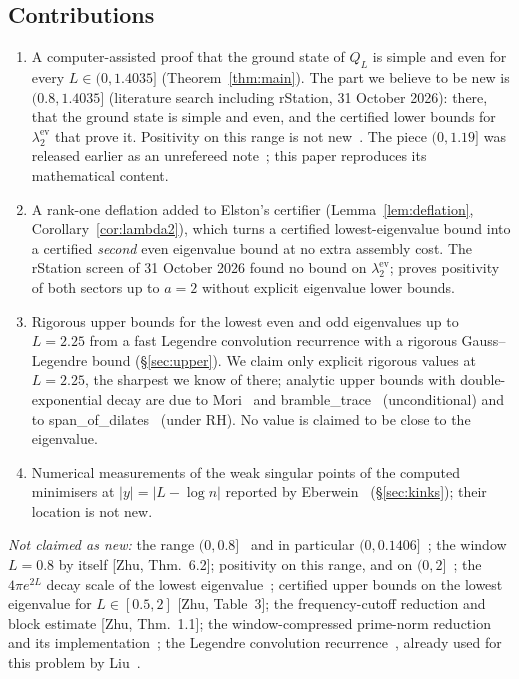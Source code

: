 \documentclass[11pt]{amsart}
\newcommand{\Lmax}{1.4035}                                %
\newcommand{\ev}{\mathrm{ev}}
\theoremstyle{definition}
\theoremstyle{remark}
\numberwithin{equation}{section}
\begin{document}
\subsection{Contributions}
\begin{enumerate}
\item A computer-assisted proof that the ground state of $Q_L$ is simple and even for every $L\in(0,\Lmax]$ (Theorem~\ref{thm:main}). The part we believe to be new is $(0.8,\Lmax]$ (literature search including rStation, 31 October 2026): there, that the ground state is simple and even, and the certified lower bounds for $\lambda_2^\ev$ that prove it. Positivity on this range is not new~\cite{rh45,rh60}. The piece $(0,1.19]$ was released earlier as an unrefereed note~\cite{Botha}; this paper reproduces its mathematical content.
\item A rank-one deflation added to Elston's certifier (Lemma~\ref{lem:deflation}, Corollary~\ref{cor:lambda2}), which turns a certified lowest-eigenvalue bound into a certified \emph{second} even eigenvalue bound at no extra assembly cost. The rStation screen of 31 October 2026 found no bound on $\lambda_2^\ev$; \cite{rh60} proves positivity of both sectors up to $a=2$ without explicit eigenvalue lower bounds.
\item Rigorous upper bounds for the lowest even and odd eigenvalues up to $L=2.25$ from a fast Legendre convolution recurrence with a rigorous Gauss--Legendre bound (\S\ref{sec:upper}). We claim only explicit rigorous values at $L=2.25$, the sharpest we know of there; analytic upper bounds with double-exponential decay are due to Mori~\cite[Thm.~K]{MoriV} and bramble\_trace~\cite[Thm.~2.1]{rh25} (unconditional) and to span\_of\_dilates~\cite[Thm.~1]{rh81} (under RH). No value is claimed to be close to the eigenvalue.
\item Numerical measurements of the weak singular points of the computed minimisers at $|y|=|L-\log n|$ reported by Eberwein~\cite[\S13]{Eberwein} (\S\ref{sec:kinks}); their location is not new.
\end{enumerate}
\emph{Not claimed as new:} the range $(0,0.8]$~\cite{KB} and in particular $(0,0.1406]$~\cite{PL}; the window $L=0.8$ by itself [Zhu, Thm.~6.2]; positivity on this range, and on $(0,2]$~\cite{rh45,rh60}; the $4\pi e^{2L}$ decay scale of the lowest eigenvalue~\cite{Connes26,MoriV,rh80,rh81}; certified upper bounds on the lowest eigenvalue for $L\in[0.5,2]$ [Zhu, Table~3]; the frequency-cutoff reduction and block estimate [Zhu, Thm.~1.1]; the window-compressed prime-norm reduction and its implementation~\cite{Elston}; the Legendre convolution recurrence~\cite{HaleTownsend}, already used for this problem by Liu~\cite{Liu}.
\end{document}
